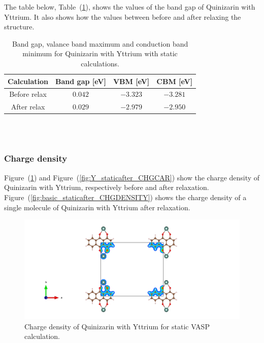 \documentclass{article}
\begin{document}
      The table below, Table~(\ref{tab:bandgapY}), shows the values of the band gap of Quinizarin with Yttrium. It also shows how the values between before and after relaxing the structure. \\

      \begin{table}[H]
        \centering
        \caption{Band gap, valance band maximum and conduction band minimum for Quinizarin with Yttrium with static calculations. }
        \vspace{0mm}
        \label{tab:bandgapY}
        \begin{tabular}{|c|c|c|c|}
            \hline
            Calculation & Band gap [eV] & VBM [eV] & CBM [eV]  \\
            \hline \hline
            Before relax & $0.042$ & $-3.323$ & $-3.281$ \\
            After relax & $0.029$ & $-2.979$ & $-2.950$ \\
            \hline
        \end{tabular} \\
        \hspace{0pt}\\
      \end{table}

      \vspace{1cm}

    \subsubsection{Charge density}

      Figure~(\ref{fig:Y_staticbefore_CHGCAR}) and Figure~(\ref{fig:Y_staticafter_CHGCAR}) show the charge density of Quinizarin with Yttrium, respectively before and after relaxation. Figure~(\ref{fig:basic_staticafter_CHGDENSITY}) shows the charge density of a single molecule of Quinizarin with Yttrium after relaxation. \\

      \begin{figure}[H]
        \centering
        \includegraphics[width = \textwidth]{../fig/Y_staticbefore_CHGCAR.png}
        \caption{Charge density of Quinizarin with Yttrium for static VASP calculation. }
        \label{fig:Y_staticbefore_CHGCAR}
      \end{figure}
\end{document}
